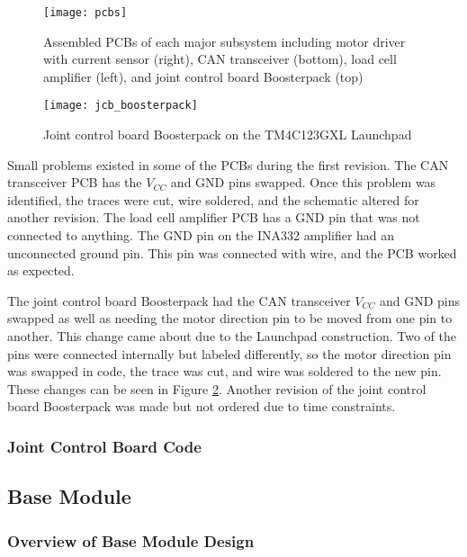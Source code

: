 \begin{figure}[H]
	\centering
	\texttt{[image: pcbs]}
	\caption{Assembled PCBs of each major subsystem including motor driver with current sensor (right), CAN transceiver (bottom), load cell amplifier (left), and joint control board Boosterpack (top)}
	\label{fig:pcbs}
\end{figure}

\begin{figure}[H]
\centering
\texttt{[image: jcb\_boosterpack]}
\caption{Joint control board Boosterpack on the TM4C123GXL Launchpad}
\label{fig:jcb_boosterpack}
\end{figure}

\noindent Small problems existed in some of the PCBs during the first revision. The CAN transceiver PCB has the $V_{CC}$ and GND pins swapped. Once this problem was identified, the traces were cut, wire soldered, and the schematic altered for another revision. The load cell amplifier PCB has a GND pin that was not connected to anything. The GND pin on the INA332 amplifier had an unconnected ground pin. This pin was connected with wire, and the PCB worked as expected.

\noindent The joint control board Boosterpack had the CAN transceiver $V_{CC}$ and GND pins swapped as well as needing the motor direction pin to be moved from one pin to another. This change came about due to the Launchpad construction. Two of the pins were connected internally but labeled differently, so the motor direction pin was swapped in code, the trace was cut, and wire was soldered to the new pin. These changes can be seen in Figure \ref{fig:jcb_boosterpack}. Another revision of the joint control board Boosterpack was made but not ordered due to time constraints.

\subsubsection{Joint Control Board Code}

\subsection{Base Module}
\subsubsection{Overview of Base Module Design}
